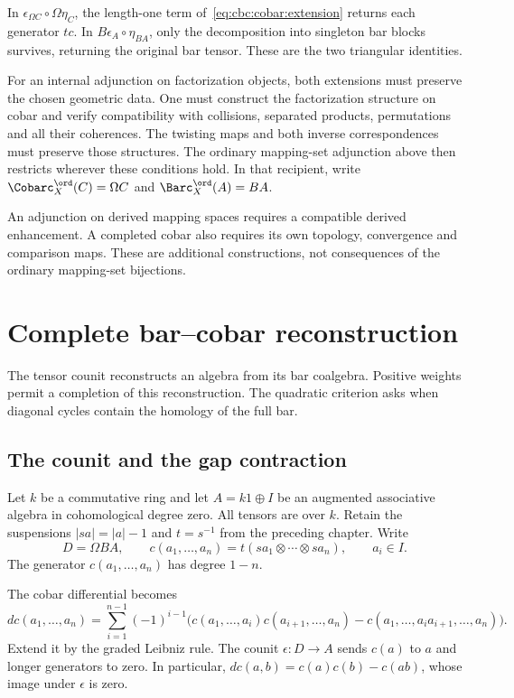 In $\epsilon_{\Omega C}\circ\Omega\eta_C$, the length-one term of~\eqref{eq:cbc:cobar:extension} returns each generator $tc$.
In $B\epsilon_A\circ\eta_{BA}$, only the decomposition into singleton bar blocks survives, returning the original bar tensor.
These are the two triangular identities.

For an internal adjunction on factorization objects, both extensions must preserve the chosen geometric data.
One must construct the factorization structure on cobar and verify compatibility with collisions, separated products, permutations and all their coherences.
The twisting maps and both inverse correspondences must preserve those structures.
The ordinary mapping-set adjunction above then restricts wherever these conditions hold.
In that recipient, write $\Cobarc_X^{\ord}(C)=\Omega C$ and $\Barc_X^{\ord}(A)=BA$.

An adjunction on derived mapping spaces requires a compatible derived enhancement.
A completed cobar also requires its own topology, convergence and comparison maps.
These are additional constructions, not consequences of the ordinary mapping-set bijections.

\chapter{Complete bar--cobar reconstruction}
The tensor counit reconstructs an algebra from its bar coalgebra.
Positive weights permit a completion of this reconstruction.
The quadratic criterion asks when diagonal cycles contain the homology of the full bar.

\section{The counit and the gap contraction}
Let $k$ be a commutative ring and let $A=k1\oplus I$ be an augmented associative algebra in cohomological degree zero.
All tensors are over $k$.
Retain the suspensions $|sa|=|a|-1$ and $t=s^{-1}$ from the preceding chapter.
Write
\[
 D=\Omega BA,\qquad c(a_1,\ldots,a_n)=t(sa_1\otimes\cdots\otimes sa_n),
 \qquad a_i\in I.
\]
The generator $c(a_1,\ldots,a_n)$ has degree $1-n$.

The cobar differential becomes
\begin{equation}\label{eq:cbc:reconstruction:blocks}
 dc(a_1,\ldots,a_n)=\sum_{i=1}^{n-1}(-1)^{i-1}
 \bigl(c(a_1,\ldots,a_i)c(a_{i+1},\ldots,a_n)
       -c(a_1,\ldots,a_i a_{i+1},\ldots,a_n)\bigr).
\end{equation}
Extend it by the graded Leibniz rule.
The counit $\epsilon:D\to A$ sends $c(a)$ to $a$ and longer generators to zero.
In particular, $dc(a,b)=c(a)c(b)-c(ab)$, whose image under $\epsilon$ is zero.

